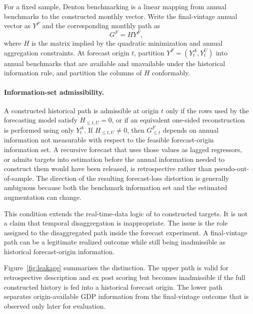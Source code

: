 \documentclass[preprint,12pt,authoryear]{elsarticle}
\begin{document}
For a fixed sample, Denton benchmarking is a linear mapping from annual benchmarks to the constructed monthly vector. Write the final-vintage annual vector as $Y^F$ and the corresponding monthly path as
\begin{equation}
G^F=H Y^F,
\label{eq:linear_operator}
\end{equation}
where $H$ is the matrix implied by the quadratic minimization and annual aggregation constraints. At forecast origin $t$, partition $Y^F=(Y_t^A,Y_t^U)$ into annual benchmarks that are available and unavailable under the historical information rule, and partition the columns of $H$ conformably.

\paragraph{Information-set admissibility.}
A constructed historical path is admissible at origin $t$ only if the rows used by the forecasting model satisfy $H_{\leq t,U}=0$, or if an equivalent one-sided reconstruction is performed using only $Y_t^A$. If $H_{\leq t,U}\neq0$, then $G^F_{\leq t}$ depends on annual information not measurable with respect to the feasible forecast-origin information set. A recursive forecast that uses those values as lagged regressors, or admits targets into estimation before the annual information needed to construct them would have been released, is retrospective rather than pseudo-out-of-sample. The direction of the resulting forecast-loss distortion is generally ambiguous because both the benchmark information set and the estimated augmentation can change.

This condition extends the real-time-data logic of \citet{croushorestark2001} to constructed targets. It is not a claim that temporal disaggregation is inappropriate. The issue is the role assigned to the disaggregated path inside the forecast experiment. A final-vintage path can be a legitimate realized outcome while still being inadmissible as historical forecast-origin information.

Figure~\ref{fig:leakage} summarizes the distinction. The upper path is valid for retrospective description and ex post scoring but becomes inadmissible if the full constructed history is fed into a historical forecast origin. The lower path separates origin-available GDP information from the final-vintage outcome that is observed only later for evaluation.
\end{document}
